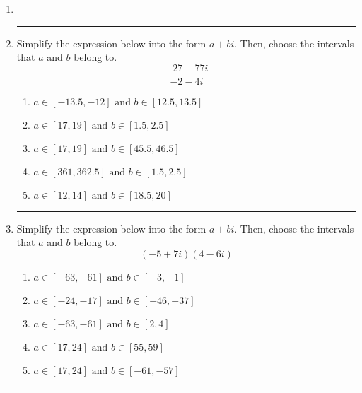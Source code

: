 \documentclass[14pt]{extbook}
\newcommand{\litem}[1]{\item#1\hspace*{-1cm}\rule{\textwidth}{0.4pt}}
\begin{document}
\begin{enumerate}
\litem{
\begin{enumerate}[label=\Alph*.]

\end{enumerate} }
\litem{
Simplify the expression below into the form $a+bi$. Then, choose the intervals that $a$ and $b$ belong to.\[ \frac{-27 - 77 i}{-2 - 4 i} \]\begin{enumerate}[label=\Alph*.]
\item \( a \in [-13.5, -12] \text{ and } b \in [12.5, 13.5] \)
\item \( a \in [17, 19] \text{ and } b \in [1.5, 2.5] \)
\item \( a \in [17, 19] \text{ and } b \in [45.5, 46.5] \)
\item \( a \in [361, 362.5] \text{ and } b \in [1.5, 2.5] \)
\item \( a \in [12, 14] \text{ and } b \in [18.5, 20] \)

\end{enumerate} }
\litem{
Simplify the expression below into the form $a+bi$. Then, choose the intervals that $a$ and $b$ belong to.\[ (-5 + 7 i)(4 - 6 i) \]\begin{enumerate}[label=\Alph*.]
\item \( a \in [-63, -61] \text{ and } b \in [-3, -1] \)
\item \( a \in [-24, -17] \text{ and } b \in [-46, -37] \)
\item \( a \in [-63, -61] \text{ and } b \in [2, 4] \)
\item \( a \in [17, 24] \text{ and } b \in [55, 59] \)
\item \( a \in [17, 24] \text{ and } b \in [-61, -57] \)

\end{enumerate} }
\end{enumerate}
\end{document}
